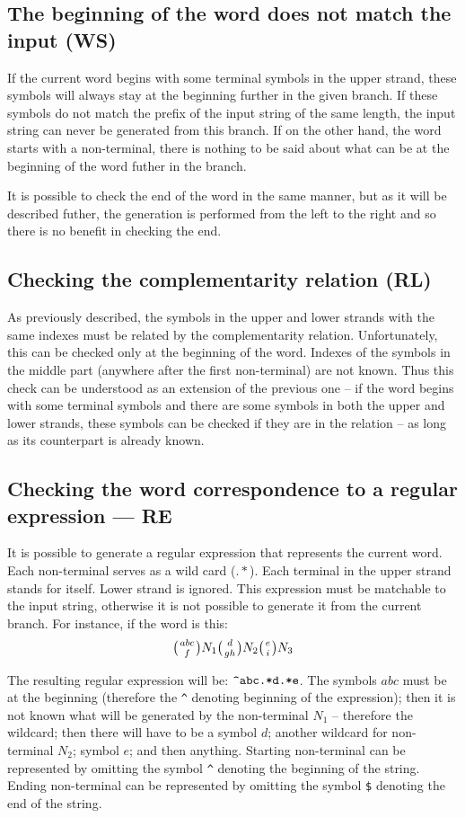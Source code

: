 \subsection{The beginning of the word does not match the input (WS)}
If the current word begins with some terminal symbols in the upper strand, these symbols will always stay at the beginning further in the given branch. If these symbols do not match the prefix of the input string of the same length, the input string can never be generated from this branch.
If on the other hand, the word starts with a non-terminal, there is nothing to be said about what can be at the beginning of the word futher in the branch.

It is possible to check the end of the word in the same manner, but as it will be described futher, the generation is performed from the left to the right and so there is no benefit in checking the end.

\subsection{Checking the complementarity relation (RL)}
As previously described, the symbols in the upper and lower strands with the same indexes must be related by the complementarity relation. Unfortunately, this can be checked only at the beginning of the word. Indexes of the symbols in the middle part (anywhere after the first non-terminal) are not known. Thus this check can be understood as an extension of the previous one -- if the word begins with some terminal symbols and there are some symbols in both the upper and lower strands, these symbols can be checked if they are in the relation -- as long as its counterpart is already known.

\subsection{Checking the word correspondence to a regular expression --- RE}
It is possible to generate a regular expression that represents the current word. Each non-terminal serves as a wild card ($.*$). Each terminal in the upper strand stands for itself. Lower strand is ignored. This expression must be matchable to the input string, otherwise it is not possible to generate it from the current branch. For instance, if the word is this:
$$\wkpair{abc}{f}N_1\wkpair{d}{gh}N_2\wkpair{e}{i}N_3$$

The resulting regular expression will be: $\verb/^abc.*d.*e/$. The symbols $abc$ must be at the beginning (therefore the \verb/^/ denoting beginning of the expression); then it is not known what will be generated by the non-terminal $N_1$ -- therefore the wildcard; then there will have to be a symbol $d$; another wildcard for non-terminal $N_2$; symbol $e$; and then anything. Starting non-terminal can be represented by omitting the symbol \verb/^/ denoting the beginning of the string. Ending non-terminal can be represented by omitting the symbol \verb/$/ denoting the end of the string.

